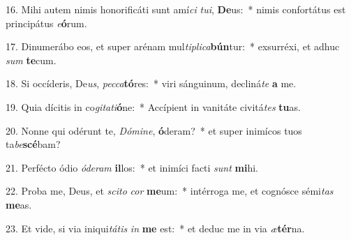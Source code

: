 16. Mihi autem nimis honorificáti sunt amí\textit{ci} \textit{tu}\textit{i}, \textbf{De}us:~*  nimis confortátus est principátus \textit{e}\textbf{ó}rum.\

17. Dinumerábo eos, et super arénam mul\textit{ti}\textit{pli}\textit{ca}\textbf{bún}tur:~*  exsurréxi, et adhuc \textit{sum} \textbf{te}cum.\

18. Si occíderis, De\textit{us}, \textit{pec}\textit{ca}\textbf{tó}res:~*  viri sánguinum, decliná\textit{te} \textbf{a} me.\

19. Quia dícitis in co\textit{gi}\textit{ta}\textit{ti}\textbf{ó}ne:~*  Accípient in vanitáte civitá\textit{tes} \textbf{tu}as.\

20. Nonne qui odérunt te, \textit{Dó}\textit{mi}\textit{ne}, \textbf{ó}deram?~*  et super inimícos tuos ta\textit{be}\textbf{scé}bam?\

21. Perfécto ódio \textit{ó}\textit{de}\textit{ram} \textbf{il}los:~*  et inimíci facti \textit{sunt} \textbf{mi}hi.\

22. Proba me, Deus, et \textit{sci}\textit{to} \textit{cor} \textbf{me}um:~*  intérroga me, et cognósce sémi\textit{tas} \textbf{me}as.\

23. Et vide, si via iniqui\textit{tá}\textit{tis} \textit{in} \textbf{me} est:~*  et deduc me in via \textit{æ}\textbf{tér}na.\

